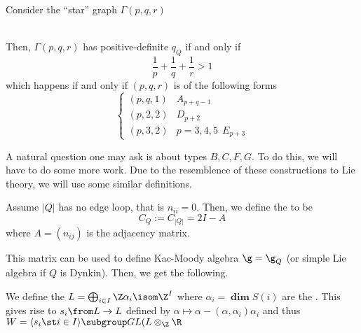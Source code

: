 \documentclass[11pt,leqno,oneside]{amsbook}
\numberwithin{thm}{section}
\renewcommand{\Q}{Q} %
\newcommand{\grdim}{\boldsymbol{\dim}} %
\begin{document}
\begin{cor}
  Consider the ``star'' graph \(\Gamma(p,q,r)\) \\
   \\
  Then, \(\Gamma(p,q,r)\) has positive-definite \(q_\Q\) if and only
  if \[
    \frac{1}{p} + \frac{1}{q} + \frac{1}{r} > 1
  \]
  which happens if and only if \((p,q,r)\) is of the following
  forms \[
    \begin{cases}
      (p,q,1) & A_{p+q-1} \\
      (p,2,2) & D_{p+2} \\
      (p,3,2) & p=3,4,5 \ \ E_{p+3}
    \end{cases}
  \]
\end{cor}
A natural question one may ask is about types \(B,C,F,G\). To do this,
we will have to do some more work. Due to the resemblence of these
constructions to Lie theory, we will use some similar definitions.
\begin{defn}
  Assume \(|\Q|\) has no edge loop, that is \(n_{ii} = 0\). Then, we
  define the  to be \[
    C_\Q := C_{|\Q|} = 2I-A
  \]
  where \(A = (n_{ij})\) is the adjacency matrix. 
\end{defn}
This matrix can be used to define Kac-Moody algebra \(\g = \g_\Q\) (or
simple Lie algebra if \(\Q\) is Dynkin). Then, we get the following.
\begin{defn}\label{root-lattice-dynkin-quiver}
  We define the  \(L = \bigoplus_{i \in I} \Z \alpha_i
  \isom \Z^I\) where \(\alpha_i = \grdim S(i)\) are the . This gives rise to  \(s_i \from L
  \to L\) defined by \(\alpha \mapsto \alpha - (\alpha,\alpha_i)
  \alpha_i\) and thus  \(W = \langle  s_i \st i \in I
  \rangle \subgroup GL(L \otimes_\Z \R\)
\end{defn}
\end{document}
